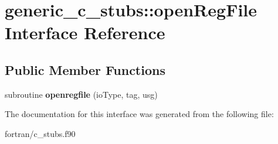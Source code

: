\hypertarget{interfacegeneric__c__stubs_1_1open_reg_file}{}\section{generic\+\_\+c\+\_\+stubs\+:\+:open\+Reg\+File Interface Reference}
\label{interfacegeneric__c__stubs_1_1open_reg_file}
\subsection*{Public Member Functions}
\begin{DoxyCompactItemize}
\item 
\mbox{\label{interfacegeneric__c__stubs_1_1open_reg_file_a666beed6a7bcad6b7bc9a0b4add414ed}} 
subroutine {\bfseries openregfile} (io\+Type, tag, usg)
\end{DoxyCompactItemize}


The documentation for this interface was generated from the following file\+:\begin{DoxyCompactItemize}
\item 
fortran/c\+\_\+stubs.\+f90\end{DoxyCompactItemize}
